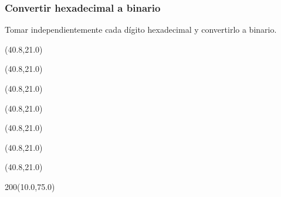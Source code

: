 \documentclass[aspectratio=169]{beamer}
\begin{document}
\begin{frame}[fragile,t]
    \frametitle{Convertir hexadecimal a binario}
    Tomar independientemente cada dígito hexadecimal y convertirlo a binario.
    \begin{textblock}{20}(40.8,21.0)  \end{textblock}
    \begin{textblock}{20}(40.8,21.0)  \end{textblock}
    \begin{textblock}{20}(40.8,21.0)  \end{textblock}
    \begin{textblock}{20}(40.8,21.0)  \end{textblock}
    \begin{textblock}{20}(40.8,21.0)  \end{textblock}
    \begin{textblock}{20}(40.8,21.0)  \end{textblock}
    \begin{textblock}{20}(40.8,21.0)  \end{textblock}
    \begin{textblock}{200}(10.0,75.0)  \end{textblock}
\end{frame}
\end{document}
